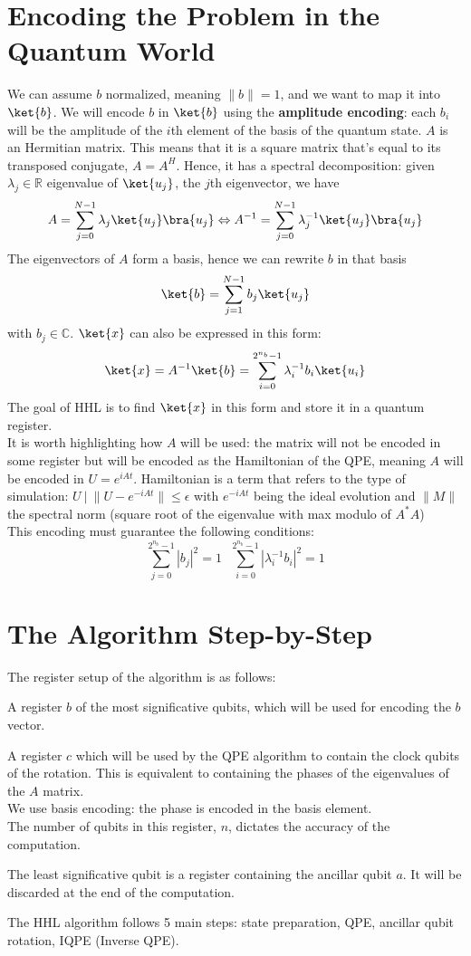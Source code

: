 \documentclass[10pt]{article}
\begin{document}
\section{Encoding the Problem in the Quantum World}
We can assume $b$ normalized, meaning $\|b\|=1$, and we want to map it into $\ket{b}$. We will encode $b$ in $\ket{b}$ using the \textbf{amplitude encoding}: each $b_i$ will be the amplitude of the $i$th element of the basis of the quantum state.
$A$ is an Hermitian matrix. This means that it is a square matrix that's equal to its transposed conjugate, $A=A^H$. Hence, it has a spectral decomposition: given $\lambda_j\in\mathbb{R}$ eigenvalue of $\ket{u_j}$, the $j$th eigenvector, we have 
$$A=\sum_{j=0}^{N-1} \lambda_j\ket{u_j}\bra{u_j}\Leftrightarrow A^{-1} = \sum_{j=0}^{N-1}\lambda_j^{-1}\ket{u_j}\bra{u_j}$$
The eigenvectors of $A$ form a basis, hence we can rewrite $b$ in that basis
$$\ket{b} = \sum_{j=1}^{N-1}b_j\ket{u_j}$$
with $b_j\in\mathbb{C}$. $\ket{x}$ can also be expressed in this form:
$$\ket{x}=A^{-1}\ket{b}=\sum_{i=0}^{2^{n_b}-1}\lambda_i^{-1}b_i\ket{u_i}$$
The goal of HHL is to find $\ket{x}$ in this form and store it in a quantum register.\\
It is worth highlighting how $A$ will be used: the matrix will not be encoded in some register but will be encoded as the Hamiltonian of the QPE, meaning $A$ will be encoded in $U=e^{iAt}$. Hamiltonian is a term that refers to the type of simulation: $U\:|\:\|U-e^{-iAt}\|\leq\epsilon$ with $e^{-iAt}$ being the ideal evolution and $\|M\|$ the spectral norm (square root of the eigenvalue with max modulo of $A^*A$)\\
This encoding must guarantee the following conditions:
$$\sum_{j=0}^{2^{n_b}-1}|b_j|^2=1\:\:\:\sum_{i=0}^{2^{n_b}-1}|\lambda_i^{-1}b_i|^2=1$$
\section{The Algorithm Step-by-Step}
The register setup of the algorithm is as follows:
\begin{list}{}{}
	\item A register $b$ of the most significative qubits, which will be used for encoding the $b$ vector.
	\item A register $c$ which will be used by the QPE algorithm to contain the clock qubits of the rotation. This is equivalent to containing the phases of the eigenvalues of the $A$ matrix.\\
	We use basis encoding: the phase is encoded in the basis element.\\
	The number of qubits in this register, $n$, dictates the accuracy of the computation.
	\item The least significative qubit is a register containing the ancillar qubit $a$. It will be discarded at the end of the computation.
\end{list}
The HHL algorithm follows 5 main steps: state preparation, QPE, ancillar qubit rotation, IQPE (Inverse QPE).
\end{document}
